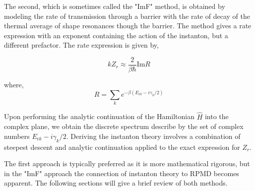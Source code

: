 \documentclass[phd,tocprelim]{cornell}
\begin{document}
The second, which is sometimes called the "ImF" method,  is obtained by modeling the rate of transmission through a barrier with the rate of decay of the thermal average of  shape resonances though the barrier. The method gives a rate expression with an exponent containing the action of the instanton, but a different prefactor. The rate expression is given by,

\begin{equation}
k Z_r \approx \frac{2}{\beta \hbar} \textrm{Im} R
\end{equation} 

where, 
\begin{equation}
R = \sum_k e^{-\beta (E_{{\textrm{r}} k} -i\gamma_k/2)}
\end{equation} 

Upon performing the analytic continuation of the Hamiltonian $\hat{H}$ into the complex plane, we obtain the discrete spectrum describe by the set of complex numbers $E_{{\textrm{r}} k} -i\gamma_k/2$. Deriving the instanton theory involves  a combination of steepest descent and analytic continuation applied to the exact expression for $Z_r$.

The first approach is typically preferred as it is more mathematical rigorous, but in the "ImF" approach the connection of instanton theory to RPMD becomes apparent. The following sections will give a brief review of both methods. 
\end{document}
